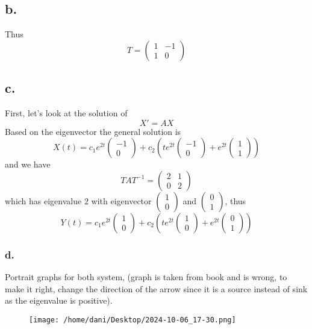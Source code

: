 \documentclass[11pt]{article}
\theoremstyle{mystyle}
\theoremstyle{definition}
\begin{document}
\subsection*{b.}
Thus 
\[
  T = 
  \begin{pmatrix}
    1 & -1\\
    1 & 0
  \end{pmatrix}
\]
\subsection*{c.}
First, let's look at the solution of 
\[
  X' = AX
\]
Based on the eigenvector the general solution is 
\[
  X(t) = c_1 e^{2t} 
  \begin{pmatrix}
    -1 \\
    0 
  \end{pmatrix}
  + c_2 \left(te^{2t} 
  \begin{pmatrix}
    -1 \\
    0
  \end{pmatrix}
  + e^{2t}
  \begin{pmatrix}
    1 \\
    1 
  \end{pmatrix}
    \right)
\]
and we have 
\[
  T A T^{-1} = 
  \begin{pmatrix}
    2 & 1 \\
    0 & 2 
  \end{pmatrix}
\]
which has eigenvalue $2$ with eigenvector $ \begin{pmatrix}
  1 \\ 0
\end{pmatrix}$ and $ \begin{pmatrix}
  0 \\ 1
\end{pmatrix}$,  thus 
\[
  Y(t) = c_1 e^{2t} 
  \begin{pmatrix}
    1 \\
    0 
  \end{pmatrix}
  + c_2 \left(te^{2t} 
  \begin{pmatrix}
    1 \\
    0
  \end{pmatrix}
  + e^{2t}
  \begin{pmatrix}
    0 \\
    1 
  \end{pmatrix}
    \right)
\]
\subsubsection*{d.}
Portrait graphs for both system, (graph is taken from book and is wrong, to make it right, change the direction of the arrow since it is a source instead of sink as the eigenvalue is positive).
\begin{figure}[h]
  \centering
  \texttt{[image: /home/dani/Desktop/2024-10-06\_17-30.png]}
  \caption{}
  \label{fig:2024-10-06_17-30}
\end{figure}
\end{document}
